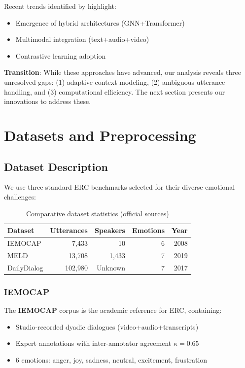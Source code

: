 \documentclass[a4paper,11pt]{article}
\begin{document}
Recent trends identified by \cite{chen2023emotion} highlight:
\begin{itemize}
    \item Emergence of hybrid architectures (GNN+Transformer)
    \item Multimodal integration (text+audio+video)
    \item Contrastive learning adoption
\end{itemize}

\textbf{Transition}: While these approaches have advanced, our analysis reveals three unresolved gaps: (1) adaptive context modeling, (2) ambiguous utterance handling, and (3) computational efficiency. The next section presents our innovations to address these.

\section{Datasets and Preprocessing}
\subsection{Dataset Description}
We use three standard ERC benchmarks selected for their diverse emotional challenges:

\begin{table}[h]
\centering
\begin{tabular}{lrrrr}
\toprule
Dataset & Utterances & Speakers & Emotions & Year \\
\midrule
IEMOCAP & 7,433 & 10 & 6 & 2008 \\
MELD & 13,708 & 1,433 & 7 & 2019 \\
DailyDialog & 102,980 & Unknown & 7 & 2017 \\
\bottomrule
\end{tabular}
\caption{Comparative dataset statistics (official sources)}
\label{tab:datasets_stats}
\end{table}

\subsubsection{IEMOCAP}
The \textbf{IEMOCAP} corpus \cite{busso2008iemocap} is the academic reference for ERC, containing:
\begin{itemize}
    \item Studio-recorded dyadic dialogues (video+audio+transcripts)
    \item Expert annotations with inter-annotator agreement $\kappa=0.65$
    \item 6 emotions: anger, joy, sadness, neutral, excitement, frustration
\end{itemize}
\end{document}
